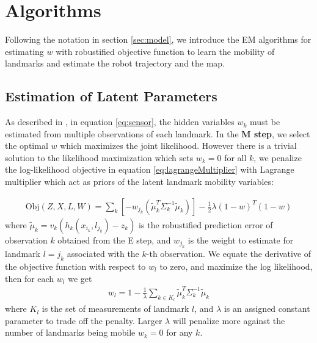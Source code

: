 \section{Algorithms}
Following the notation in section \ref{sec:model}, we introduce the EM algorithms for estimating $w$ with robustified objective function to learn the mobility of landmarks and estimate the robot trajectory and the map.

\subsection{Estimation of Latent Parameters}
\label{sec:traditionalEM}

As described in \cite{rogers2010slam}, in equation \ref{eq:sensor}, the hidden variables $w_k$ must be estimated from multiple observations of each landmark. In the \textbf{M step}, we select the optimal $w$ which maximizes the joint likelihood. However there is a trivial solution to the likelihood maximization which sets $w_k = 0$ for all $k$, we penalize the log-likelihood objective in equation \ref{eq:lagrangeMultiplier} with Lagrange multiplier which act as priors of the latent landmark mobility variables:

\begin{equation}
\begin{aligned}
\mathrm{Obj}(Z, X, L, W) = \sum_k \left[ -w_{j_k}(\tilde{\mu}^T_k\Sigma_k^{-1}\tilde{\mu}_k) \right] - \frac{1}{2}\lambda(1 - w)^T(1 - w)
\end{aligned}
\label{eq:lagrangeMultiplier}
\end{equation}
where $\tilde{\mu}_k = v_k (h_k(x_{i_k}, l_{j_k}) - z_k)$ is the robustified prediction error of observation $k$ obtained from the E step, and $w_{j_k}$ is the weight to estimate for landmark $l = j_k$ associated with the $k$-th observation. We equate the derivative of the objective function with respect to $w_l$ to zero, and maximize the log likelihood, then for each $w_l$ we get
\begin{equation}
\begin{aligned}
w_l = 1 - \frac{1}{\lambda} \sum_{k \in K_l}\tilde{\mu}^T_k\Sigma_k^{-1}\tilde{\mu}_k
\end{aligned}
\label{eq:wk}
\end{equation}
where $K_l$ is the set of measurements of landmark $l$, and $\lambda$ is an assigned constant parameter to trade off the penalty. Larger $\lambda$ will penalize more against the number of landmarks being mobile $w_k = 0$ for any $k$.

